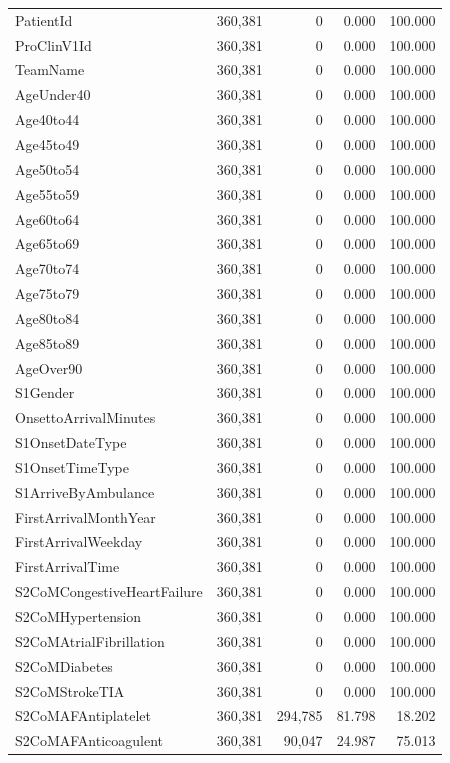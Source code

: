 \begin{longtable}{lrrrr}
PatientId & 360,381 & 0 & 0.000 & 100.000 \\
ProClinV1Id & 360,381 & 0 & 0.000 & 100.000 \\
TeamName & 360,381 & 0 & 0.000 & 100.000 \\
AgeUnder40 & 360,381 & 0 & 0.000 & 100.000 \\
Age40to44 & 360,381 & 0 & 0.000 & 100.000 \\
Age45to49 & 360,381 & 0 & 0.000 & 100.000 \\
Age50to54 & 360,381 & 0 & 0.000 & 100.000 \\
Age55to59 & 360,381 & 0 & 0.000 & 100.000 \\
Age60to64 & 360,381 & 0 & 0.000 & 100.000 \\
Age65to69 & 360,381 & 0 & 0.000 & 100.000 \\
Age70to74 & 360,381 & 0 & 0.000 & 100.000 \\
Age75to79 & 360,381 & 0 & 0.000 & 100.000 \\
Age80to84 & 360,381 & 0 & 0.000 & 100.000 \\
Age85to89 & 360,381 & 0 & 0.000 & 100.000 \\
AgeOver90 & 360,381 & 0 & 0.000 & 100.000 \\
S1Gender & 360,381 & 0 & 0.000 & 100.000 \\
OnsettoArrivalMinutes & 360,381 & 0 & 0.000 & 100.000 \\
S1OnsetDateType & 360,381 & 0 & 0.000 & 100.000 \\
S1OnsetTimeType & 360,381 & 0 & 0.000 & 100.000 \\
S1ArriveByAmbulance & 360,381 & 0 & 0.000 & 100.000 \\
FirstArrivalMonthYear & 360,381 & 0 & 0.000 & 100.000 \\
FirstArrivalWeekday & 360,381 & 0 & 0.000 & 100.000 \\
FirstArrivalTime & 360,381 & 0 & 0.000 & 100.000 \\
S2CoMCongestiveHeartFailure & 360,381 & 0 & 0.000 & 100.000 \\
S2CoMHypertension & 360,381 & 0 & 0.000 & 100.000 \\
S2CoMAtrialFibrillation & 360,381 & 0 & 0.000 & 100.000 \\
S2CoMDiabetes & 360,381 & 0 & 0.000 & 100.000 \\
S2CoMStrokeTIA & 360,381 & 0 & 0.000 & 100.000 \\
S2CoMAFAntiplatelet & 360,381 & 294,785 & 81.798 & 18.202 \\
S2CoMAFAnticoagulent & 360,381 & 90,047 & 24.987 & 75.013 \\

\end{longtable}
